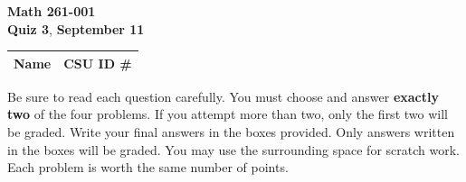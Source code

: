\documentclass[12pt]{exam}
\newcommand{\class}{Math 261-001}
\newcommand{\examnum}{Quiz 3}
\newcommand{\examdate}{September 11}
\begin{document}
\pagestyle{plain}
\thispagestyle{empty}

\noindent
\textbf{\class}\\
\textbf{\examnum}, \textbf{\examdate} \\

\setlength{\tabcolsep}{3.5cm}
\renewcommand{\arraystretch}{1.5}
\setlength\extrarowheight{1cm}
\begin{tabular}{ |c|c| }
 \hline
 Name   & CSU ID \#  \\
 \hline
\end{tabular}

\vspace{10pt}

Be sure to read each question carefully. You must choose and answer
\textbf{exactly two} of the four problems. If you attempt more than two, only
the first two will be graded. Write your final answers in the boxes provided.
Only answers written in the boxes will be graded. You may use the surrounding
space for scratch work. Each problem is worth the same number of points.
\end{document}
